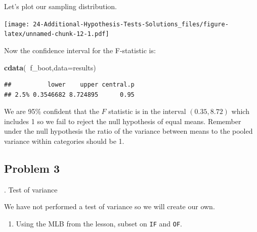 \documentclass[
]{book}
\newenvironment{Shaded}{\begin{snugshade}}{\end{snugshade}}
\newcommand{\DataTypeTok}[1]{\textcolor[rgb]{0.13,0.29,0.53}{#1}}
\newcommand{\KeywordTok}[1]{\textcolor[rgb]{0.13,0.29,0.53}{\textbf{#1}}}
\newcommand{\NormalTok}[1]{#1}
\newcommand{\OperatorTok}[1]{\textcolor[rgb]{0.81,0.36,0.00}{\textbf{#1}}}
\newcommand{\StringTok}[1]{\textcolor[rgb]{0.31,0.60,0.02}{#1}}
\providecommand{\tightlist}{%
  \setlength{\itemsep}{0pt}\setlength{\parskip}{0pt}}
\begin{document}
Let's plot our sampling distribution.

\begin{Shaded}
\end{Shaded}

\texttt{[image: 24-Additional-Hypothesis-Tests-Solutions\_files/figure-latex/unnamed-chunk-12-1.pdf]}

Now the confidence interval for the F-statistic is:

\begin{Shaded}
\begin{Highlighting}[]
\KeywordTok{cdata}\NormalTok{(}\OperatorTok{~}\NormalTok{f_boot,}\DataTypeTok{data=}\NormalTok{results)}
\end{Highlighting}
\end{Shaded}

\begin{verbatim}
##          lower    upper central.p
## 2.5% 0.3546682 8.724895      0.95
\end{verbatim}

We are 95\% confident that the \(F\) statistic is in the interval \((0.35,8.72)\) which includes 1 so we fail to reject the null hypothesis of equal means. Remember under the null hypothesis the ratio of the variance between means to the pooled variance within categories should be 1.

\hypertarget{problem-3-17}{%
\subsection{Problem 3}\label{problem-3-17}}

. Test of variance

We have not performed a test of variance so we will create our own.

\begin{enumerate}
\def\labelenumi{\alph{enumi}.}
\tightlist
\item
  Using the MLB from the lesson, subset on \texttt{IF} and \texttt{OF}.
\end{enumerate}
\end{document}
